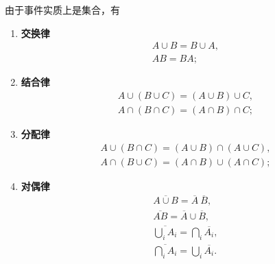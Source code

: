 \begin{theorem}[事件的运算规律]
由于事件实质上是集合，有
\begin{enumerate}
	\item {\rm\bf 交换律}
	\begin{gather}
		A \cup B = B \cup A, \\
		A B = B A;
	\end{gather}

	\item {\rm\bf 结合律}
	\begin{gather}
		A \cup (B \cup C) = (A \cup B) \cup C, \\
		A \cap (B \cap C) = (A \cap B) \cap C;
	\end{gather}

	\item {\rm\bf 分配律}
	\begin{gather}
		A \cup (B \cap C) = (A \cup B) \cap (A \cup C), \\
		A \cap (B \cup C) = (A \cap B) \cup (A \cap C);
	\end{gather}

	\item {\rm\bf 对偶律}
	\begin{gather}
		\overline{A \cup B} = \overline{A}\ \overline{B}, \\
		\overline{AB} = \overline{A} \cup \overline{B}, \\
		\overline{\bigcup_i A_i} = \bigcap_i \overline{A_i}, \\
		\overline{\bigcap_i A_i} = \bigcup_i \overline{A_i}.
	\end{gather}
\end{enumerate}
\end{theorem}
